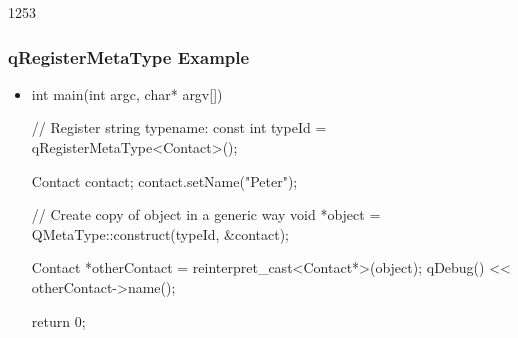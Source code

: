 \begin{slide}[fragile]{1253}
\frametitle{qRegisterMetaType Example}
\begin{itemize}
\item[]
\begin{cpp}
int main(int argc, char* argv[])
{
    // Register string typename:
    const int typeId = qRegisterMetaType<Contact>();

    Contact contact;
    contact.setName("Peter");

    // Create copy of object in a generic way
    void *object = QMetaType::construct(typeId, &contact);

    Contact *otherContact = reinterpret_cast<Contact*>(object);
    qDebug() << otherContact->name();

    return 0;
}
\end{cpp}
\end{itemize}
\end{slide}
